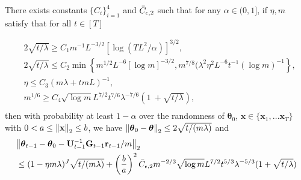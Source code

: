 \begin{auxlemma}
\label{lemma:lin_vs_regresion}
There exists constants $\{C_i\}^4_{i=1}$ and $\Bar{C}_{\epsilon,2}$ such that for
any $\alpha \in (0,1]$, if $\eta, m$ satisfy that for all $t \in [T]$ 

\begin{equation*}
\begin{split}
    & 2\sqrt{t/\lambda}\ge C_{1}m^{-1}L^{-3/2}\left[\log(T L^{2}/\alpha)\right]^{3/2}, \\
    & 2\sqrt{t/\lambda}\leq C_{2}\operatorname*{min}\left\{m^{1/2}L^{-6}[\log m]^{-3/2},m^{7/8}(\lambda^2 \eta^2L^{-6}t^{-1}(\log m)^{-1}\right\},\\
    & \eta\le C_{3}(m\lambda+t m L)^{-1}, \\
    & m^{1/6}\ge C_{4}\sqrt{\log m}L^{7/2}t^{7/6}\lambda^{-7/6}(1\ +\sqrt{t/\lambda}), \\
\end{split}
\end{equation*}
then with probability at least $1-\alpha$ over the randomness of $\boldsymbol{\theta}_0$, $\mathbf{x} \in \{\mathbf{x}_1, \dots \mathbf{x}_T\}$ with $0<  a \le \norm{\mathbf{x}}_2 \le b$, we have $\norm{\boldsymbol{\theta}_0 -  \boldsymbol{\theta}}_2 \le 2{\sqrt{t/(m\lambda)}}$ and
\begin{align*}
            &\norm{\boldsymbol{\theta}_{t-1} - \boldsymbol{\theta}_0 - \mathbf{U}^{-1}_{t-1}\mathbf{G}_{t-1} \mathbf{r}_{t-1}/m}_2\\
         & \leq(1-\eta m\lambda)^{J}\sqrt{t/(m\lambda)}+\left(\frac{b}{a}\right)^2 \Bar{C}_{\epsilon, 2}m^{-2/3}\sqrt{\log m}L^{7/2}t^{5/3}\lambda^{-5/3}(1+\sqrt{t/\lambda}) \\
    \end{align*}
\end{auxlemma}

